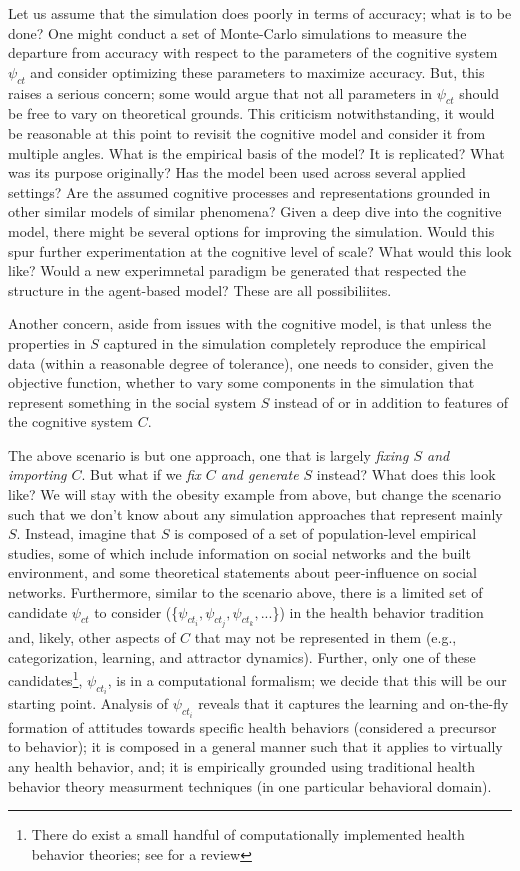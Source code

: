 \documentclass{article}
\begin{document}
Let us assume that the simulation does poorly in terms of accuracy; what is to be done?  One might conduct a set of Monte-Carlo simulations to measure the departure from accuracy with respect to the parameters of the cognitive system $\psi_{ct}$ and consider optimizing these parameters to maximize accuracy. But, this raises a serious concern; some would argue that not all parameters in $\psi_{ct}$ should be free to vary on theoretical grounds\cite{reitter2010}.  This criticism notwithstanding, it would be reasonable at this point to revisit the cognitive model and consider it from multiple angles.  What is the empirical basis of the model?  It is replicated?  What was its purpose originally?  Has the model been used across several applied settings?  Are the assumed cognitive processes and representations grounded in other similar models of similar phenomena?  Given a deep dive into the cognitive model, there might be several options for improving the simulation.  Would this spur further experimentation at the cognitive level of scale? What would this look like?  Would a new experimnetal paradigm be generated that respected the structure in the agent-based model?  These are all possibiliites.

Another concern, aside from issues with the cognitive model, is that unless the properties in $S$ captured in the simulation completely reproduce the empirical data (within a reasonable degree of tolerance), one needs to consider, given the objective function, whether to vary some components in the simulation that represent something in the social system $S$ instead of or in addition to features of the cognitive system $C$. 
  
The above scenario is but one approach, one that is largely \textit{fixing $S$ and importing $C$}.  But what if we \textit{fix $C$ and generate $S$} instead?  What does this look like?  We will stay with the obesity example from above, but change the scenario such that we don't know about any simulation approaches that represent mainly $S$.  Instead, imagine that $S$ is composed of a set of population-level empirical studies, some of which include information on social networks and the built environment, and some theoretical statements about peer-influence on social networks. Furthermore, similar to the scenario above, there is a limited set of candidate $\psi_{ct}$ to consider (\{$\psi_{ct_i}, \psi_{ct_j}, \psi_{ct_k},...$\}) in the health behavior tradition and, likely, other aspects of $C$ that may not be represented in them (e.g., categorization, learning, and attractor dynamics).  Further, only one of these candidates\footnote{There do exist a small handful of computationally implemented health behavior theories; see \cite{orr2017readbook} for a review}, $\psi_{ct_i}$, is in a computational formalism; we decide that this will be our starting point.  Analysis of $\psi_{ct_i}$ reveals that it captures the learning and on-the-fly formation of attitudes towards specific health behaviors (considered a precursor to behavior); it is composed in a general manner such that it applies to virtually any health behavior, and; it is empirically grounded using traditional health behavior theory measurment techniques (in one particular behavioral domain). 
\end{document}
